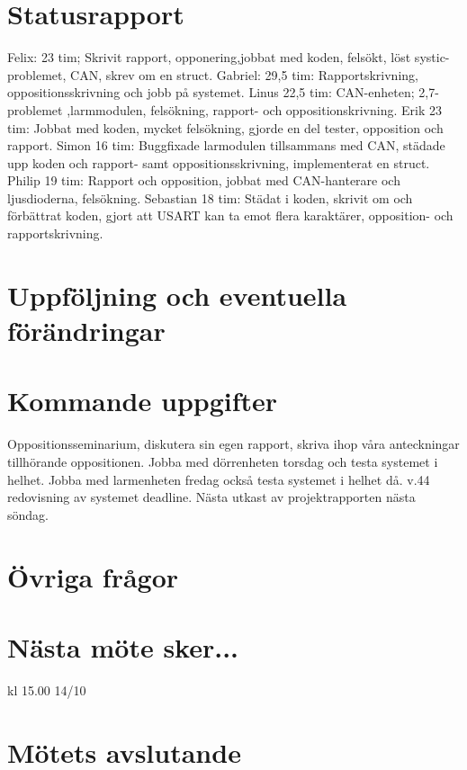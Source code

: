 \documentclass{article}
\begin{document}
\section{Statusrapport}
Felix: 23 tim; Skrivit rapport, opponering,jobbat med koden, felsökt, löst systic-problemet, CAN, skrev om en struct.
\newline
Gabriel: 29,5 tim: Rapportskrivning, oppositionsskrivning och jobb på systemet.
\newline
Linus 22,5 tim: CAN-enheten; 2,7-problemet ,larmmodulen, felsökning, rapport- och oppositionskrivning.
\newline
Erik 23 tim: Jobbat med koden, mycket felsökning, gjorde en del tester, opposition och rapport.
\newline
Simon 16 tim: Buggfixade larmodulen tillsammans med CAN, städade upp koden och rapport- samt oppositionsskrivning, implementerat en struct.
\newline
Philip 19 tim: Rapport och opposition, jobbat med CAN-hanterare och ljusdioderna, felsökning.
\newline
Sebastian 18 tim: Städat i koden, skrivit om och förbättrat koden, gjort att USART kan ta emot flera karaktärer, opposition- och rapportskrivning.


\section{Uppföljning och eventuella förändringar} 

\section{Kommande uppgifter}
Oppositionsseminarium, diskutera sin egen rapport, skriva ihop våra anteckningar tillhörande oppositionen. Jobba med dörrenheten torsdag och testa systemet i helhet. Jobba med larmenheten fredag också testa systemet i helhet då.
\newline\newline
v.44 redovisning av systemet deadline.
\newline\newline
Nästa utkast av projektrapporten nästa söndag.

\section{Övriga frågor} 

\section{Nästa möte sker...} 

kl 15.00 14/10

\section{Mötets avslutande} 
\end{document}
